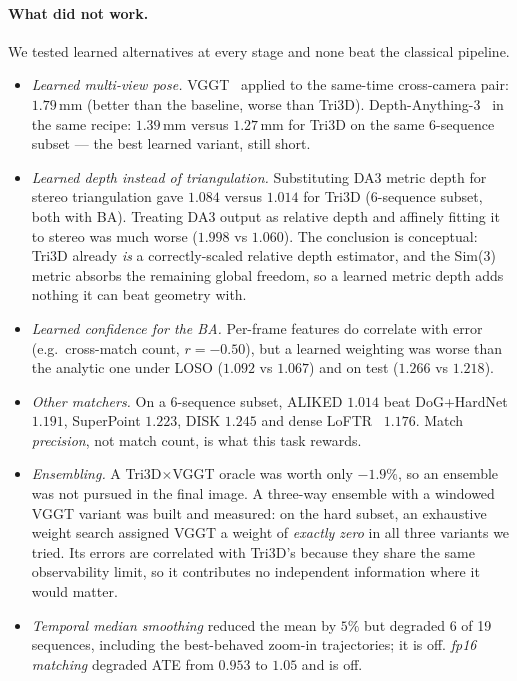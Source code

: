 \paragraph{What did not work.} We tested learned alternatives at every stage and none beat the classical
pipeline.
\begin{itemize}\itemsep1pt
  \item \emph{Learned multi-view pose.} VGGT~\cite{wang2025vggt} applied to the same-time cross-camera
        pair: $1.79$\,mm (better than the baseline, worse than Tri3D). Depth-Anything-3~\cite{depthanything3}
        in the same recipe: $1.39$\,mm versus $1.27$\,mm for Tri3D on the same 6-sequence subset ---
        the best learned variant, still short.
  \item \emph{Learned depth instead of triangulation.} Substituting DA3 metric depth for stereo
        triangulation gave $1.084$ versus $1.014$ for Tri3D (6-sequence subset, both with BA). Treating
        DA3 output as relative depth and affinely fitting it to stereo was much worse ($1.998$ vs
        $1.060$). The conclusion is conceptual: Tri3D already \emph{is} a correctly-scaled relative depth
        estimator, and the Sim(3) metric absorbs the remaining global freedom, so a learned metric depth
        adds nothing it can beat geometry with.
  \item \emph{Learned confidence for the BA.} Per-frame features do correlate with error
        (e.g.\ cross-match count, $r=-0.50$), but a learned weighting was worse than the analytic one
        under LOSO ($1.092$ vs $1.067$) and on test ($1.266$ vs $1.218$).
  \item \emph{Other matchers.} On a 6-sequence subset, ALIKED $1.014$ beat DoG+HardNet $1.191$,
        SuperPoint $1.223$, DISK $1.245$ and dense LoFTR~\cite{sun2021loftr} $1.176$. Match
        \emph{precision}, not match count, is what this task rewards.
  \item \emph{Ensembling.} A Tri3D$\times$VGGT oracle was worth only $-1.9\%$, so an ensemble was not
        pursued in the final image. A three-way ensemble with a windowed VGGT variant was built and
        measured: on the hard subset, an exhaustive weight search assigned VGGT a weight of \emph{exactly
        zero} in all three variants we tried. Its errors are correlated with Tri3D's because they share
        the same observability limit, so it contributes no independent information where it would matter.
  \item \emph{Temporal median smoothing} reduced the mean by $5\%$ but degraded 6 of 19 sequences,
        including the best-behaved zoom-in trajectories; it is off. \emph{fp16 matching} degraded ATE from
        $0.953$ to $1.05$ and is off.
\end{itemize}

